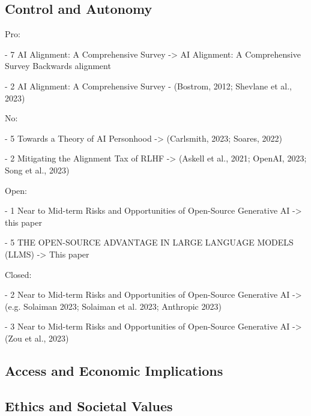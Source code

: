 \subsection{Control and Autonomy}

Pro:

- 7 AI Alignment: A Comprehensive Survey -> AI Alignment: A Comprehensive Survey
Backwards alignment
\citep{ji_ai_2023}


- 2 AI Alignment: A Comprehensive Survey - (Bostrom, 2012; Shevlane et al., 2023)
\citep{bostrom_superintelligent_2012}
\citep{shevlane_model_2023}

No:

- 5 Towards a Theory of AI Personhood -> (Carlsmith, 2023; Soares, 2022)
\citep{carlsmith_scheming_2023}
\citep{soares_central_2022}

- 2 Mitigating the Alignment Tax of RLHF -> (Askell et al., 2021; OpenAI, 2023; Song et al., 2023)
\citep{askell_general_2021}
\citep{openai_gpt_4_2023}
\citep{song_reward_2023}

Open: 

- 1 Near to Mid-term Risks and Opportunities of Open-Source Generative AI -> this paper
\citep{eiras_near_2024}

- 5 THE OPEN-SOURCE ADVANTAGE IN LARGE LANGUAGE MODELS (LLMS) -> This paper
\citep{manchanda_open_2025}

Closed:

- 2 Near to Mid-term Risks and Opportunities of Open-Source Generative AI -> (e.g. Solaiman 2023; Solaiman et al. 2023; Anthropic 2023)
\citep{solaiman_gradient_2023}
\citep{solaiman_evaluating_2024}

- 3 Near to Mid-term Risks and Opportunities of Open-Source Generative AI -> (Zou et al., 2023)
\citep{zou_universal_2023}

\subsection{Access and Economic Implications}

\subsection{Ethics and Societal Values}
